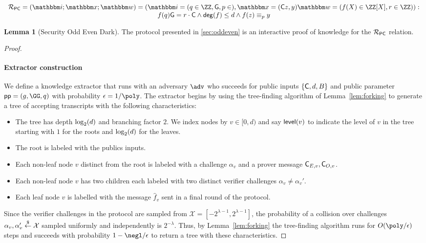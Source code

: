 \documentclass{article}
\theoremstyle{definition}
\newtheorem{lemma}{Lemma}
\begin{document}
\begin{equation*}
		\begin{array}{c}
	\Relation_\PC=(\NPIndex;\NPInstance;\NPWitness)= (\NPIndex=(q \in \ZZ,\Generator ,p\in  ) ,\NPInstance=( \Commitment z,y) \NPWitness=( f(X) \in \ZZ[X], r  \in \ZZ)):\\
		f(q) \Generator = r \cdot \Commitment \wedge \degree(f)\leq d \wedge f(z) \equiv_p y
	\end{array}
 \end{equation*}

\begin{lemma}[Security Odd Even Dark]
	The protocol presented in \cref{sec:oddeven} is an interactive proof of knowledge for the $\mathcal{R}_{\mathsf{PC}}$ relation.
\end{lemma}
\begin{proof}

~\paragraph{Extractor construction}
		We define a knowledge extractor that runs with an adversary $\adv$ who succeeds for public inputs $\{\mathsf{C},d,B \}$ and public parameter $\crs=(g,\GG,q)$ with probability $\epsilon = 1/\poly$. The extractor begins by using the tree-finding algorithm of Lemma~\ref{lem:forking} to generate a tree of accepting transcripts with the following characteristics: 
\begin{itemize}
\item The tree has depth $\log_2(d)$ and branching factor $2$. We index nodes by $v \in [0, d)$ and say $\textsf{level}(v)$ to indicate the level of $v$ in the tree starting with $1$ for the roots and $\log_2(d)$ for the leaves.
\item The root is labeled with the publics inputs. 
\item Each non-leaf node $v$ distinct from the root is labeled with a challenge $\alpha_{v}$ and a prover message $\mathsf{C}_{E,v},\mathsf{C}_{O,v}$.
\item Each non-leaf node $v$ has two children each labeled with two distinct verifier challenges 
$\alpha_{v} \neq \alpha_{v}'$.
\item Each leaf node $v$ is labelled with the message $\hat{f}_v$ sent in a final round of the protocol. 
\end{itemize} 

Since the verifier challenges in the protocol are sampled from $\mathcal{X} = [-2^{\lambda -1}, 2^{\lambda -1}]$, the probability of a collision over challenges $\alpha_v, \alpha_v' \overset{\$}{\gets} \mathcal{X}$ sampled uniformly and independently is $2^{-\lambda}$. Thus, by Lemma~\ref{lem:forking} the tree-finding algorithm runs for $O(\poly/\epsilon)$ steps and succeeds with probability $1 - \negl/\epsilon$ to return a tree with these characteristics.


\end{proof}
\end{document}
